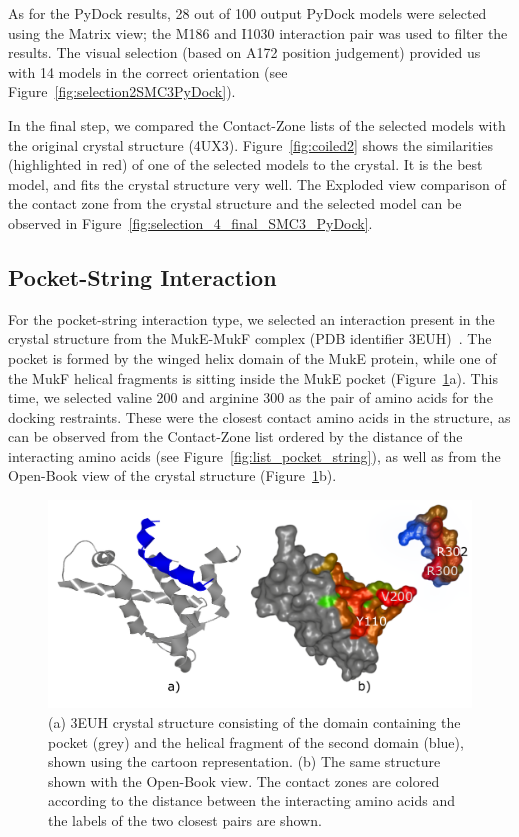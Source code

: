 \documentclass[twocolumn]{bmcart}%
\def\OpBook {Open-Book view\xspace}
\def\ExpView {Exploded view\xspace}
\def\MatView {Matrix view\xspace}
\def\CoZoList{Contact-Zone list\xspace}
\def\CoZoLists{Contact-Zone lists\xspace}
\begin{document}
As for the PyDock results, 28 out of 100 output PyDock models were selected using the \MatView; the M186 and I1030 interaction pair was used to filter the results.
The visual selection (based on A172 position judgement) provided us with 14 models in the correct orientation (see Figure~\ref{fig:selection2SMC3PyDock}).

In the final step, we compared the \CoZoLists of the selected models with the original crystal structure (4UX3). 
Figure~\ref{fig:coiled2} shows the similarities (highlighted in red) of one of the selected models to the crystal. It is the best model, and fits the crystal structure very well. The \ExpView comparison of the contact zone from the crystal structure and the selected model can be observed in Figure~\ref{fig:selection_4_final_SMC3_PyDock}.

\subsection*{Pocket-String Interaction}
For the pocket-string interaction type, we selected an interaction present in the crystal structure from the MukE-MukF complex (PDB identifier 3EUH)~\cite{Woo}. 
The pocket is formed by the winged helix domain of the MukE protein, while one of the MukF helical fragments is sitting inside the MukE pocket (Figure~\ref{fig:MukEF_crystal_3EUH_selected}a). 
This time, we selected valine 200 and arginine 300 as the pair of amino acids for the docking restraints. 
These were the closest contact amino acids in the structure, as can be observed from the \CoZoList ordered by the distance of the interacting amino acids (see Figure~\ref{fig:list_pocket_string}), as well as from the \OpBook of the crystal structure (Figure~\ref{fig:MukEF_crystal_3EUH_selected}b). 

\begin{figure}[b!]
    \centering
    \includegraphics[width=0.9\columnwidth]{images/figure15.pdf}
    \vspace{-5pt}
    \caption{(a) 3EUH crystal structure consisting of the domain containing the pocket (grey) and the helical fragment of the second domain (blue), shown using the cartoon representation. (b) The same structure shown with the \OpBook. The contact zones are colored according to the distance between the interacting amino acids and the labels of the two closest pairs are shown.}
  \label{fig:MukEF_crystal_3EUH_selected}
\end{figure}
\end{document}
